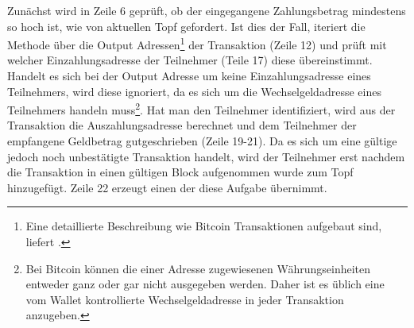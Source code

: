 
Zunächst wird in Zeile 6 geprüft, ob der eingegangene Zahlungsbetrag mindestens so hoch ist, wie von aktuellen Topf gefordert. Ist dies der Fall, iteriert die Methode über die Output Adressen\footnote{Eine detaillierte Beschreibung wie Bitcoin Transaktionen aufgebaut sind, liefert \cite{understanding_btc_txn}.} der Transaktion (Zeile 12) und prüft mit welcher Einzahlungsadresse der Teilnehmer (Teile 17) diese übereinstimmt. Handelt es sich bei der Output Adresse um keine Einzahlungsadresse eines Teilnehmers, wird diese ignoriert, da es sich um die Wechselgeldadresse eines Teilnehmers handeln muss\footnote{Bei Bitcoin können die einer Adresse zugewiesenen Währungseinheiten entweder ganz oder gar nicht ausgegeben werden. Daher ist es üblich eine vom Wallet kontrollierte Wechselgeldadresse in jeder Transaktion anzugeben.}. Hat man den Teilnehmer identifiziert, wird aus der Transaktion die Auszahlungsadresse berechnet und dem Teilnehmer der empfangene Geldbetrag gutgeschrieben (Zeile 19-21). Da es sich um eine gültige jedoch noch unbestätigte Transaktion handelt, wird der Teilnehmer erst nachdem die Transaktion in einen gültigen Block aufgenommen wurde zum Topf hinzugefügt. Zeile 22 erzeugt einen  der diese Aufgabe übernimmt.


